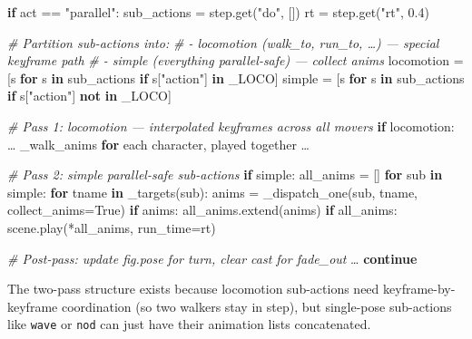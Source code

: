\documentclass[
  12pt,
  letterpaper,
]{book}
\newenvironment{Shaded}{}{}
\newcommand{\CommentTok}[1]{\textcolor[rgb]{0.38,0.63,0.69}{\textit{#1}}}
\newcommand{\ControlFlowTok}[1]{\textcolor[rgb]{0.00,0.44,0.13}{\textbf{#1}}}
\newcommand{\FloatTok}[1]{\textcolor[rgb]{0.25,0.63,0.44}{#1}}
\newcommand{\KeywordTok}[1]{\textcolor[rgb]{0.00,0.44,0.13}{\textbf{#1}}}
\newcommand{\NormalTok}[1]{#1}
\newcommand{\OperatorTok}[1]{\textcolor[rgb]{0.40,0.40,0.40}{#1}}
\newcommand{\StringTok}[1]{\textcolor[rgb]{0.25,0.44,0.63}{#1}}
\newcommand{\VariableTok}[1]{\textcolor[rgb]{0.10,0.09,0.49}{#1}}
\begin{document}
\begin{Shaded}
\begin{Highlighting}[]
\ControlFlowTok{if}\NormalTok{ act }\OperatorTok{==} \StringTok{"parallel"}\NormalTok{:}
\NormalTok{    sub\_actions }\OperatorTok{=}\NormalTok{ step.get(}\StringTok{"do"}\NormalTok{, [])}
\NormalTok{    rt }\OperatorTok{=}\NormalTok{ step.get(}\StringTok{"rt"}\NormalTok{, }\FloatTok{0.4}\NormalTok{)}

    \CommentTok{\# Partition sub{-}actions into:}
    \CommentTok{\#  {-} locomotion (walk\_to, run\_to, …) — special keyframe path}
    \CommentTok{\#  {-} simple (everything parallel{-}safe) — collect anims}
\NormalTok{    locomotion }\OperatorTok{=}\NormalTok{ [s }\ControlFlowTok{for}\NormalTok{ s }\KeywordTok{in}\NormalTok{ sub\_actions }\ControlFlowTok{if}\NormalTok{ s[}\StringTok{"action"}\NormalTok{] }\KeywordTok{in}\NormalTok{ \_LOCO]}
\NormalTok{    simple     }\OperatorTok{=}\NormalTok{ [s }\ControlFlowTok{for}\NormalTok{ s }\KeywordTok{in}\NormalTok{ sub\_actions }\ControlFlowTok{if}\NormalTok{ s[}\StringTok{"action"}\NormalTok{] }\KeywordTok{not} \KeywordTok{in}\NormalTok{ \_LOCO]}

    \CommentTok{\# Pass 1: locomotion — interpolated keyframes across all movers}
    \ControlFlowTok{if}\NormalTok{ locomotion:}
\NormalTok{        … \_walk\_anims }\ControlFlowTok{for}\NormalTok{ each character, played together …}

    \CommentTok{\# Pass 2: simple parallel{-}safe sub{-}actions}
    \ControlFlowTok{if}\NormalTok{ simple:}
\NormalTok{        all\_anims }\OperatorTok{=}\NormalTok{ []}
        \ControlFlowTok{for}\NormalTok{ sub }\KeywordTok{in}\NormalTok{ simple:}
            \ControlFlowTok{for}\NormalTok{ tname }\KeywordTok{in}\NormalTok{ \_targets(sub):}
\NormalTok{                anims }\OperatorTok{=}\NormalTok{ \_dispatch\_one(sub, tname, collect\_anims}\OperatorTok{=}\VariableTok{True}\NormalTok{)}
                \ControlFlowTok{if}\NormalTok{ anims:}
\NormalTok{                    all\_anims.extend(anims)}
        \ControlFlowTok{if}\NormalTok{ all\_anims:}
\NormalTok{            scene.play(}\OperatorTok{*}\NormalTok{all\_anims, run\_time}\OperatorTok{=}\NormalTok{rt)}

    \CommentTok{\# Post{-}pass: update fig.pose for turn, clear cast for fade\_out}
\NormalTok{    …}
    \ControlFlowTok{continue}
\end{Highlighting}
\end{Shaded}

The two-pass structure exists because locomotion sub-actions need
keyframe-by-keyframe coordination (so two walkers stay in step), but
single-pose sub-actions like \texttt{wave} or \texttt{nod} can just have
their animation lists concatenated.
\end{document}
